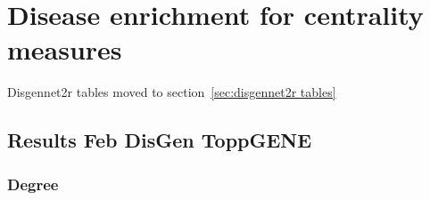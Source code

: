\clearpage



\section{Disease enrichment for centrality measures}

Disgennet2r tables moved to section~\ref{sec:disgennet2r tables}



\subsection{Results Feb DisGen ToppGENE}
\subsubsection{Degree}
